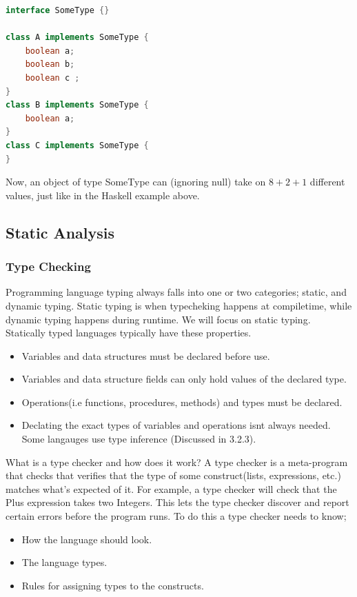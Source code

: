 \documentclass{article}
\begin{document}
\begin{itemize}
\begin{lstlisting}[language=Java]
interface SomeType {}

class A implements SomeType {
    boolean a;
    boolean b;
    boolean c ;
}
class B implements SomeType {
    boolean a;
}
class C implements SomeType {
}

\end{lstlisting}
    Now, an object of type SomeType can (ignoring null) take on $8 + 2 + 1$ different values,
    just like in the Haskell example above.


        \end{itemize}
        \subsection{Static Analysis}
            \subsubsection{Type Checking}
            Programming language typing always falls into one or two categories; static, and dynamic typing. Static typing is when typecheking happens at compiletime, 
            while dynamic typing happens during runtime. We will focus on static typing. 
            Statically typed languages typically have these properties.
            \begin{itemize}
                \item Variables and data structures must be declared before use.
                \item Variables and data structure fields can only hold values of the declared type.
                \item Operations(i.e functions, procedures, methods) and types must be declared.
                \item Declating the exact types of variables and operations isnt always needed. Some langauges use type inference (Discussed in 3.2.3).
            \end{itemize}

            What is a type checker and how does it work? 
            A type checker is a meta-program that checks that verifies that the type of some construct(lists, expressions, etc.) matches what's expected of it.
            For example, a type checker will check that the Plus \gls{expression} takes two Integers. This lets the type checker discover and report certain errors before the program runs. 
            To do this a type checker needs to know;
            \begin{itemize}
                \item How the language should look.
                \item The language types.
                \item Rules for assigning types to the constructs.
            \end{itemize}
\end{document}

